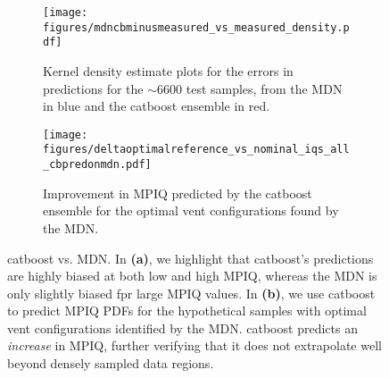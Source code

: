 \begin{figure*}
    \begin{minipage}{.97\textwidth}
        \begin{subfigure}{0.49\textwidth}
            \centering
            \texttt{[image: figures/mdncbminusmeasured\_vs\_measured\_density.pdf]}
            \caption{Kernel density estimate plots for the errors in predictions for the $\sim6600$ test samples, from the MDN in blue and the {\sc catboost} ensemble in red.}
            \label{fig:mdncbminusmeasured_vs_measured_density}
        \end{subfigure}
        \hfill
        \begin{subfigure}{0.49\textwidth}
            \centering
            \texttt{[image: figures/deltaoptimalreference\_vs\_nominal\_iqs\_all\_cbpredonmdn.pdf]}
            \caption{Improvement in MPIQ predicted by the {\sc catboost} ensemble for the optimal vent configurations found by the MDN.}
            \label{fig:deltaoptimalreference_vs_nominal_iqs_all_cbpredonmdn}
        \end{subfigure}
        \caption{{\sc catboost} vs. MDN. In \textbf{(a)}, %
        we highlight that {\sc catboost}'s predictions are highly biased at both low and high MPIQ, whereas the MDN is only slightly biased fpr large MPIQ values. %
        In \textbf{(b)}, we use {\sc catboost} to predict MPIQ PDFs for the hypothetical samples with optimal vent configurations identified by the MDN. {\sc catboost} predicts an \textit{increase} in MPIQ, further verifying that it does not extrapolate well beyond densely sampled data regions.}
        \label{fig:cbonmdn}
    \end{minipage}
\end{figure*}   
    
